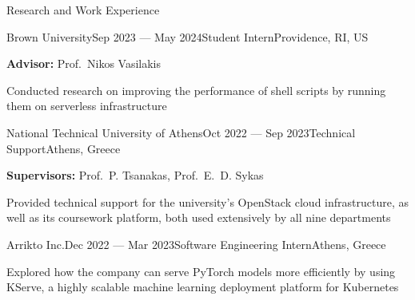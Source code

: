 \documentclass[letterpaper, 12pt]{resume}
\begin{document}
\begin{rSection}{Research and Work Experience}
    \begin{rSubsection}{Brown University}{Sep 2023 --- May 2024}{Student Intern}{Providence, RI, US}
        \item \textbf{Advisor:} Prof.\ Nikos Vasilakis
        \item Conducted research on improving the performance of shell scripts by running them on serverless infrastructure
    \end{rSubsection}

    \begin{rSubsection}{National Technical University of Athens}{Oct 2022 --- Sep 2023}{Technical Support}{Athens, Greece}
        \item \textbf{Supervisors:} Prof.\ P. Tsanakas, Prof.\ E.\ D. Sykas
        \item Provided technical support for the university's OpenStack cloud infrastructure, as well as its coursework platform, both used extensively by all nine departments
    \end{rSubsection}

    \begin{rSubsection}{Arrikto Inc.}{Dec 2022 --- Mar 2023}{Software Engineering Intern}{Athens, Greece}
        \item Explored how the company can serve PyTorch models more efficiently by using KServe, a highly scalable machine learning deployment platform for Kubernetes
    \end{rSubsection}

\end{rSection}
\end{document}
